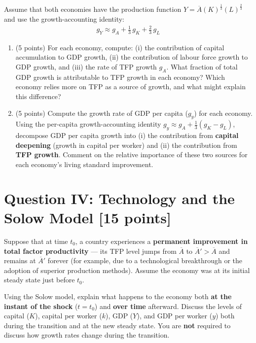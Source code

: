 \documentclass[letterpaper,12pt]{article}
\theoremstyle{dotlessS}
\begin{document}
\noindent Assume that both economies have the production function $Y = \overline{A}(K)^{\frac{1}{3}}(L)^{\frac{2}{3}}$ and use the growth-accounting identity:
\begin{eqnarray*}
g_Y \approx g_A + \tfrac{1}{3}\,g_K + \tfrac{2}{3}\,g_L
\end{eqnarray*}

\begin{enumerate}[label=(\alph*)]
\item (5 points) For each economy, compute: (i) the contribution of capital accumulation to GDP growth, (ii) the contribution of labour force growth to GDP growth, and (iii) the rate of TFP growth $g_A$. What fraction of total GDP growth is attributable to TFP growth in each economy? Which economy relies more on TFP as a source of growth, and what might explain this difference?

\item (5 points) Compute the growth rate of GDP per capita ($g_y$) for each economy. Using the per-capita growth-accounting identity $g_y \approx g_A + \frac{1}{3}(g_K - g_L)$, decompose GDP per capita growth into (i) the contribution from \textbf{capital deepening} (growth in capital per worker) and (ii) the contribution from \textbf{TFP growth}. Comment on the relative importance of these two sources for each economy's living standard improvement.
\end{enumerate}


\section*{Question IV: Technology and the Solow Model [15 points]}
Suppose that at time $t_0$, a country experiences a \textbf{permanent improvement in total factor productivity} — its TFP level jumps from $\overline{A}$ to $\overline{A}' > \overline{A}$ and remains at $\overline{A}'$ forever (for example, due to a technological breakthrough or the adoption of superior production methods). Assume the economy was at its initial steady state just before $t_0$.

Using the Solow model, explain what happens to the economy both \textbf{at the instant of the shock} ($t = t_0$) and \textbf{over time} afterward. Discuss the levels of capital ($K$), capital per worker ($k$), GDP ($Y$), and GDP per worker ($y$) both during the transition and at the new steady state. You are \textbf{not} required to discuss how growth rates change during the transition.
\end{document}
